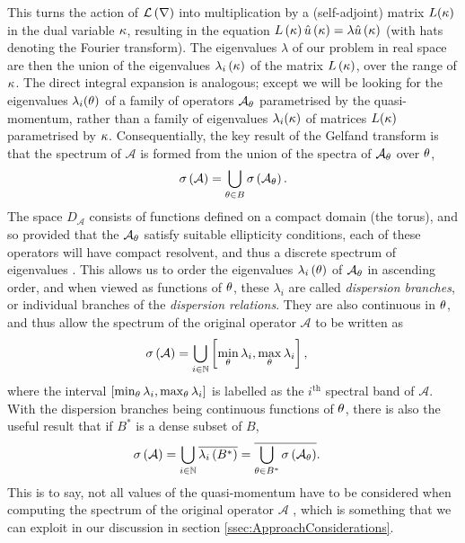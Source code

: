 This turns the action of $\mathcal{L}\left( \nabla \right)$ into multiplication by a (self-adjoint) matrix $L(\kappa)$ in the dual variable $\kappa$, resulting in the equation $L\left( \kappa \right)\hat{u}\left( \kappa \right)=\lambda\hat{u}\left( \kappa \right)$ (with hats denoting the Fourier transform).
The eigenvalues $\lambda$ of our problem in real space are then the union of the eigenvalues $\lambda_i\left( \kappa \right)$ of the matrix $L\left( \kappa \right)$, over the range of $\kappa$.
The direct integral expansion is analogous; except we will be looking for the eigenvalues $\lambda_i(\theta)$ of a family of operators $\mathcal{A}_{\theta}$ parametrised by the quasi-momentum, rather than a family of eigenvalues $\lambda_i(\kappa)$ of matrices $L(\kappa)$ parametrised by $\kappa$. 
Consequentially, the key result of the Gelfand transform is that the spectrum of $\mathcal{A}$ is formed from the union of the spectra of $\mathcal{A}_{\theta}$ over $\theta$,
\begin{align*}
	\sigma\left( \mathcal{A} \right) = \bigcup_{\theta\in B}\sigma\left( \mathcal{A}_{\theta} \right).
\end{align*}
The space $D_{\mathcal{A}}$ consists of functions defined on a compact domain (the torus), and so provided that the $\mathcal{A}_{\theta}$ satisfy suitable ellipticity conditions, each of these operators will have compact resolvent, and thus a discrete spectrum of eigenvalues \cite[section 7.3]{kuchment2001mathematics}.
This allows us to order the eigenvalues $\lambda_i\left( \theta \right)$ of $\mathcal{A}_{\theta}$ in ascending order, and when viewed as functions of $\theta$, these $\lambda_i$ are called \emph{dispersion branches}, or individual branches of the \emph{dispersion relations}.
They are also continuous in $\theta$, and thus allow the spectrum of the original operator $\mathcal{A}$ to be written as
\begin{align*}
	\sigma\left( \mathcal{A} \right) &= \bigcup_{i\in\mathbb{N}}\left[  \min_{\theta}\lambda_i, \max_{\theta}\lambda_i  \right],
\end{align*}
where the interval $\left[  \min_{\theta}\lambda_i, \max_{\theta}\lambda_i  \right]$ is labelled as the $i^{\text{th}}$ spectral band of $\mathcal{A}$.
With the dispersion branches being continuous functions of $\theta$, there is also the useful result that if $B^*$ is a dense subset of $B$,
\begin{align} \label{eq:TP-DenseQMSubsetSuffices}
	\sigma\left( \mathcal{A} \right) &= \bigcup_{i\in\mathbb{N}}\overline{\lambda_i\left( B^* \right)}
	= \overline{\bigcup_{\theta\in B^*}\sigma\left( \mathcal{A}_{\theta} \right)}.
\end{align}
This is to say, not all values of the quasi-momentum have to be considered when computing the spectrum of the original operator $\mathcal{A}$ \cite[section 7.4]{kuchment2001mathematics}, which is something that we can exploit in our discussion in section \ref{ssec:ApproachConsiderations}.

